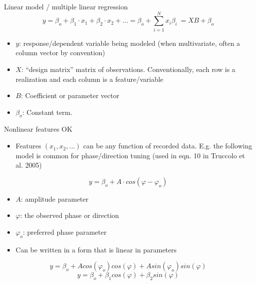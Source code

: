 \documentclass[svgnames,13pt]{beamer}
\DeclareRobustCommand{\emph}[1]{\textbf{{\color{emphasizecolor} #1}}}
\begin{document}
\begin{frame}{Linear model / multiple linear regression}
\[y = \beta_o + \beta_1 \cdot x_1 + \beta_2 \cdot x_2 + ... = \beta_o + \sum_{i=1}^N x_i \beta_i \ = XB + \beta_o\]
\begin{itemize}
	\item \emph{$y$}: response/dependent variable being modeled (when multivariate, often a column vector by convention)
	\item \emph{$X$}: ``design matrix'' matrix of observations. Conventionally, each row is a realization and each column is a feature/variable
	\item \emph{$B$}: Coefficient or parameter vector
	\item \emph{$\beta_o$}: Constant term.
\end{itemize}
\end{frame} 

\begin{frame}{Nonlinear features OK}
\begin{itemize}
	\item Features $(x_1,x_2,...)$ can be any function of recorded data. E.g. the following model is common for phase/direction tuning (used in eqn. 10 in Truccolo et al. 2005)
	\end{itemize}
\[y = \beta_o + A\cdot cos(\varphi-\varphi_o)\]
\vspace{-2em}
\begin{itemize}
	\item <2->\emph{$A$}: amplitude parameter
	\item <3->\emph{$\varphi$}: the observed phase or direction
	\item <4->\emph{$\varphi_o$}: preferred phase parameter
	\item <5->Can be written in a form that is linear in parameters
	\end{itemize}
\begin{overprint}
	\[y = \beta_o + A cos(\varphi_o) cos(\varphi) +  A sin(\varphi_o) sin(\varphi)\]
	\onslide<6>
	\[y = \beta_o + \beta_1 cos(\varphi) + \beta_2 sin(\varphi)\]
\end{overprint}
\end{frame} 


\end{document}
